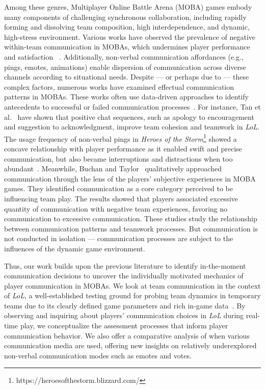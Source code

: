 Among these genres, Multiplayer Online Battle Arena (MOBA) games embody many components of challenging synchronous collaboration, including rapidly forming and dissolving team composition, high interdependence, and dynamic, high-stress environment. Various works have observed the prevalence of negative within-team communication in MOBAs, which undermines player performance and satisfaction ~\cite{monge2022effects, kou2014, canossa2021honor}. Additionally, non-verbal communication affordances (e.g., pings, emotes, animations) enable dispersion of communication across diverse channels according to situational needs. Despite --- or perhaps due to --- these complex factors, numerous works have examined effectual communication patterns in MOBAs. These works often use data-driven approaches to identify antecedents to successful or failed communication processes~\cite{tan2022, zheng2023, leavitt2016, csengun2022players}. For instance, Tan et al.~\cite{tan2022} have shown that positive chat sequences, such as apology to encouragement and suggestion to acknowledgment, improve team cohesion and teamwork in \textit{LoL}. The usage frequency of non-verbal pings in \textit{Heroes of the Storm}\footnote{https://heroesofthestorm.blizzard.com/} showed a concave relationship with player performance as it enabled swift and precise communication, but also became interruptions and distractions when too abundant~\cite{leavitt2016}. Meanwhile, Buchan and Taylor~\cite{buchan2016} qualitatively approached communication through the lens of the players' subjective experiences in MOBA games. They identified communication as a core category perceived to be influencing team play. The results showed that players associated excessive quantity of communication with negative team experiences, favoring no communication to excessive communication. These studies study the relationship between communication patterns and teamwork processes. But communication is not conducted in isolation --- communication processes are subject to the influences of the dynamic game environment.

Thus, our work builds upon the previous literature to identify in-the-moment communication decisions to uncover the individually motivated mechanics of player communication in MOBAs. We look at team communication in the context of \textit{LoL}, a well-established testing ground for probing team dynamics in temporary teams due to its clearly defined game parameters and rich in-game data~\cite{kou2014, kwak2015exploring, kwak2015linguistic}. By observing and inquiring about players' communication choices in \textit{LoL} during real-time play, we conceptualize the assessment processes that inform player communication behavior. We also offer a comparative analysis of when various communication media are used, offering new insights on relatively underexplored non-verbal communication modes such as emotes and votes.


